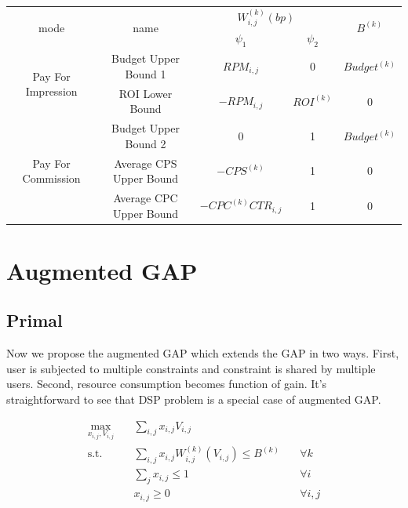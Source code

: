 \documentclass{article}
\theoremstyle{definition}
\newcommand{\sumj}{\sum\limits_j}
\newcommand{\sumij}{\sum\limits_{i,j}}
\newcommand{\sx}{x_{i,j}}
\newcommand{\sV}{V_{i,j}}
\newcommand{\sW}{W_{i,j}^{(k)}}
\newcommand{\sB}{B^{(k)}}
\newcommand{\sRPM}{RPM_{i,j}}
\newcommand{\pprob}{\psi_1}
\newcommand{\pprice}{\psi_2}
\newcommand{\agapresourceconstraint}{\sumij \sx \sW(\sV) \le \sB}
\newcommand{\assignmentconstraint}{\sumj \sx \le 1}
\begin{document}
\begin{CJK}{UTF8}{gbsn}
\begin{center}
\begin{tabular}{|c|c|c|c|c|}
\hline
\multirow{2}{*}{mode}               & \multirow{2}{*}{name}   & \multicolumn{2}{c|}{$\sW(bp)$}                      & \multirow{2}{*}{$\sB$} \\
\cline{3-4}
                                    &                         & $\pprob$                 & $\pprice$                & \\
\hline
\multirow{2}{*}{Pay For Impression} & Budget Upper Bound 1    & $\sRPM$              & 0                        & $Budget^{(k)}$ \\
\cline{2-5}
                                    & ROI Lower Bound         & $-\sRPM$             & $ROI^{(k)}$              & 0 \\
\hline
\multirow{3}{*}{Pay For Commission} & Budget Upper Bound 2    & 0                        & 1                        & $Budget^{(k)}$ \\
\cline{2-5}
                                    & Average CPS Upper Bound & $-CPS^{(k)}$             & 1                        & 0 \\
\cline{2-5}
                                    & Average CPC Upper Bound & $-CPC^{(k)}CTR_{i,j}$    & 1                        & 0 \\
\hline
\end{tabular}
\end{center}

\newpage
\section{Augmented GAP}

\subsection{Primal}

Now we propose the augmented GAP which extends the GAP in two ways.
First, user is subjected to multiple constraints and constraint is shared by multiple users.
Second, resource consumption becomes function of gain.
It's straightforward to see that DSP problem is a special case of augmented GAP.

\begin{alignat}{2}
    \max\limits_{\sx, \sV} \quad & \sumij \sx \sV \quad              & {} \\
    \mbox{s.t.} \quad            & \agapresourceconstraint \quad     & \forall k \\
    \quad                        & \assignmentconstraint \quad       & \forall i \\
    \quad                        & \sx \ge 0 \quad                   & \forall i,j
\end{alignat}


\end{CJK}
\end{document}
